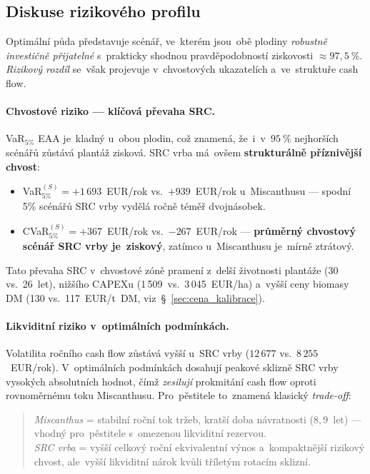 \subsection*{Diskuse rizikového profilu}

Optimální půda představuje scénář, ve~kterém jsou~obě plodiny
\emph{robustně investičně přijatelné} s~prakticky shodnou
pravděpodobností ziskovosti $\approx 97{,}5~\%$. \emph{Rizikový rozdíl}
se~však projevuje v~chvostových ukazatelích a~ve~struktuře cash flow.

\paragraph{Chvostové riziko --- klíčová převaha SRC.}
VaR$_{5\%}$ EAA je~kladný u~obou plodin, což znamená, že~i~v~$95~\%$
nejhorších scénářů zůstává plantáž zisková. SRC vrba má~ovšem
\textbf{strukturálně příznivější chvost}:
\begin{itemize}
    \item VaR$_{5\%}^{(S)} = +1\,693$~EUR/rok vs.~$+939$~EUR/rok
          u~Miscanthusu --- spodní 5\% scénářů SRC vrby vydělá
          ročně téměř dvojnásobek.
    \item CVaR$_{5\%}^{(S)} = +367$~EUR/rok vs.~$-267$~EUR/rok ---
          \textbf{průměrný chvostový scénář SRC vrby je~ziskový}, zatímco
          u~Miscanthusu je~mírně ztrátový.
\end{itemize}
Tato převaha SRC v~chvostové zóně pramení z~delší životnosti plantáže
(30 vs.~26~let), nižšího CAPEXu (1\,509~vs.~3\,045~EUR/ha) a~vyšší
ceny biomasy DM (130 vs.~117~EUR/t~DM, viz~§~\ref{sec:cena_kalibrace}).

\paragraph{Likviditní riziko v~optimálních podmínkách.}
Volatilita ročního cash flow zůstává vyšší u~SRC vrby
($12\,677$ vs.~$8\,255$~EUR/rok). V~optimálních podmínkách dosahují
peakové sklizně SRC vrby vysokých absolutních hodnot, čímž
\emph{zesilují} prokmitání cash flow oproti rovnoměrnému toku
Miscanthusu. Pro~pěstitele to~znamená klasický \emph{trade-off}:
\begin{quote}
\textit{Miscanthus} = stabilní roční tok tržeb, kratší doba
návratnosti ($8{,}9$~let) --- vhodný pro~pěstitele s~omezenou likviditní
rezervou. \\
\textit{SRC vrba} = vyšší celkový roční ekvivalentní výnos
a~kompaktnější rizikový chvost, ale~vyšší likviditní nárok kvůli
tříletým rotacím sklizní.
\end{quote}

